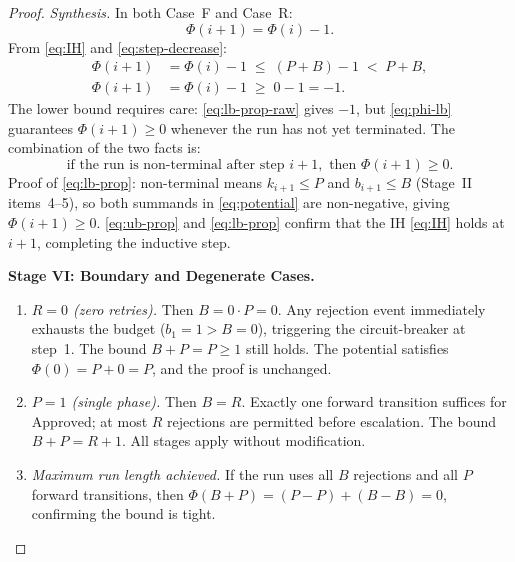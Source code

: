 \documentclass[12pt]{article}
\theoremstyle{definition}
\begin{document}
\begin{proof}
\noindent\textit{Synthesis.}  In both Case~F and Case~R:
\begin{equation}
  \label{eq:step-decrease}
  \Phi(i+1) = \Phi(i) - 1.
\end{equation}
From \eqref{eq:IH} and \eqref{eq:step-decrease}:
\begin{align}
  \Phi(i+1) &= \Phi(i) - 1
               \;\leq\; (P+B) - 1
               \;<\; P+B,
               \label{eq:ub-prop}\\
  \Phi(i+1) &= \Phi(i) - 1
               \;\geq\; 0 - 1 = -1. \label{eq:lb-prop-raw}
\end{align}
The lower bound requires care: \eqref{eq:lb-prop-raw} gives $-1$, but
\eqref{eq:phi-lb} guarantees $\Phi(i+1) \geq 0$ whenever the run has not
yet terminated.  The combination of the two facts is:
\begin{equation}
  \label{eq:lb-prop}
  \text{if the run is non-terminal after step } i+1,
  \text{ then } \Phi(i+1) \geq 0.
\end{equation}
Proof of \eqref{eq:lb-prop}: non-terminal means $k_{i+1} \leq P$ and
$b_{i+1} \leq B$ (Stage~II items~4--5), so both summands in
\eqref{eq:potential} are non-negative, giving $\Phi(i+1) \geq 0$.
\eqref{eq:ub-prop} and \eqref{eq:lb-prop} confirm that the IH
\eqref{eq:IH} holds at $i+1$, completing the inductive step. \checkmark

\medskip
\noindent\textbf{Stage VI: Boundary and Degenerate Cases.}

\begin{enumerate}
  \item \emph{$R = 0$ (zero retries).}  Then $B = 0 \cdot P = 0$.
        Any rejection event immediately exhausts the budget ($b_1 = 1
        > B = 0$), triggering the circuit-breaker at step~1.  The
        bound $B + P = P \geq 1$ still holds.  The potential satisfies
        $\Phi(0) = P + 0 = P$, and the proof is unchanged.

  \item \emph{$P = 1$ (single phase).}  Then $B = R$.  Exactly one
        forward transition suffices for $\mathrm{Approved}$; at most
        $R$ rejections are permitted before escalation.  The bound
        $B + P = R + 1$.  All stages apply without modification.

  \item \emph{Maximum run length achieved.}
        If the run uses all $B$ rejections and all $P$ forward
        transitions, then $\Phi(B+P) = (P-P)+(B-B) = 0$, confirming
        the bound is tight.


\end{enumerate}
\end{proof}
\end{document}
